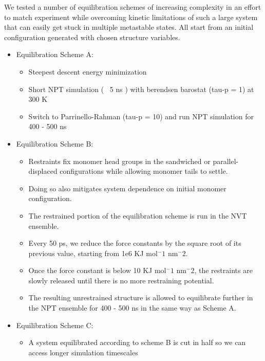 \documentclass{article}
\begin{document}
  We tested a number of equilibration schemes of increasing complexity in an effort
  to match experiment while overcoming kinetic limitations of such a large system 
  that can easily get stuck in multiple metastable states. All start from an initial
  configuration generated with chosen structure variables. 
  \begin{itemize}
      \item Equilibration Scheme A:
      \begin{itemize}
          \item Steepest descent energy minimization
          \item Short NPT simulation (~ 5 ns ) with berendsen barostat (tau-p = 1) at 300 K 
          \item Switch to Parrinello-Rahman (tau-p = 10) and run NPT simulation for 400 - 500 ns
      \end{itemize}
      \item Equilibration Scheme B:
      \begin{itemize}
          \item Restraints fix monomer head groups in the sandwiched or parallel-displaced
          configurations while allowing monomer tails to settle.
          \item Doing so also mitigates system dependence on initial monomer configuration.
          \item The restrained portion of the equilibration scheme is run in the NVT ensemble.
          \item Every 50 ps, we reduce the force constants by the square root of its
          previous value, starting from 1e6 KJ mol$^-1$ nm$^-2$.
          \item Once the force constant is below 10 KJ mol$^-1$ nm$^-2$, the restraints are
          slowly released until there is no more restraining potential.
          \item The resulting unrestrained structure is allowed to equilibrate further in the NPT
          ensemble for 400 - 500 ns in the same way as Scheme A.
      \end{itemize}
      \item Equilibration Scheme C:
      \begin{itemize} 
          \item A system equilibrated according to scheme B is cut in half so we can access
          longer simulation timescales

\end{itemize}
\end{itemize}
\end{document}
